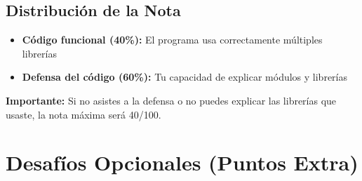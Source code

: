 \documentclass[12pt,a4paper]{article}
\begin{document}
\subsection{Distribución de la Nota}

\begin{itemize}
    \item \textbf{Código funcional (40\%):} El programa usa correctamente múltiples librerías
    \item \textbf{Defensa del código (60\%):} Tu capacidad de explicar módulos y librerías
\end{itemize}

\textbf{Importante:} Si no asistes a la defensa o no puedes explicar las librerías que usaste, la nota máxima será 40/100.

\section{Desafíos Opcionales (Puntos Extra)}
\end{document}
